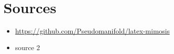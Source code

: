 \chapter{Sources}
\begin{itemize}
    \item \url{https://github.com/Pseudomanifold/latex-mimosis}
    \item source 2 
\end{itemize}